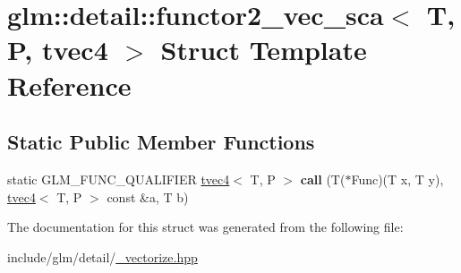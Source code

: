 \hypertarget{structglm_1_1detail_1_1functor2__vec__sca_3_01T_00_01P_00_01tvec4_01_4}{}\section{glm\+:\+:detail\+:\+:functor2\+\_\+vec\+\_\+sca$<$ T, P, tvec4 $>$ Struct Template Reference}
\label{structglm_1_1detail_1_1functor2__vec__sca_3_01T_00_01P_00_01tvec4_01_4}
\subsection*{Static Public Member Functions}
\begin{DoxyCompactItemize}
\item 
\mbox{\label{structglm_1_1detail_1_1functor2__vec__sca_3_01T_00_01P_00_01tvec4_01_4_ac8dcfe692f5b5d07ca805f981d58a913}} 
static G\+L\+M\+\_\+\+F\+U\+N\+C\+\_\+\+Q\+U\+A\+L\+I\+F\+I\+ER \hyperlink{structglm_1_1tvec4}{tvec4}$<$ T, P $>$ {\bfseries call} (T($\ast$Func)(T x, T y), \hyperlink{structglm_1_1tvec4}{tvec4}$<$ T, P $>$ const \&a, T b)
\end{DoxyCompactItemize}


The documentation for this struct was generated from the following file\+:\begin{DoxyCompactItemize}
\item 
include/glm/detail/\hyperlink{__vectorize_8hpp}{\+\_\+vectorize.\+hpp}\end{DoxyCompactItemize}
